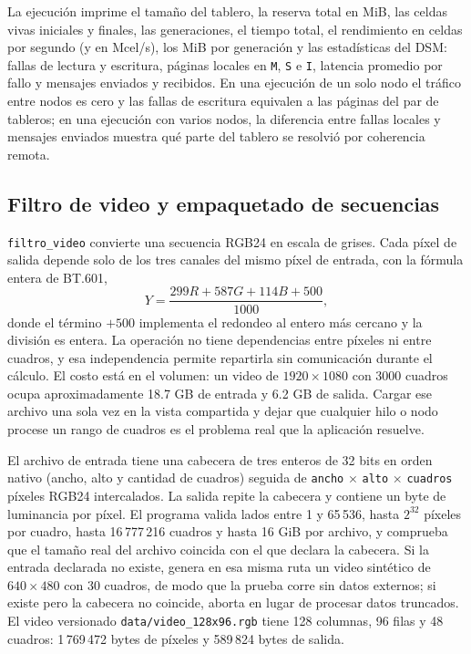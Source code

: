 La ejecución imprime el tamaño del tablero, la reserva total en MiB, las celdas vivas iniciales y finales, las generaciones, el tiempo total, el rendimiento en celdas por segundo (y en Mcel/s), los MiB por generación y las estadísticas del DSM: fallas de lectura y escritura, páginas locales en \texttt{M}, \texttt{S} e \texttt{I}, latencia promedio por fallo y mensajes enviados y recibidos. En una ejecución de un solo nodo el tráfico entre nodos es cero y las fallas de escritura equivalen a las páginas del par de tableros; en una ejecución con varios nodos, la diferencia entre fallas locales y mensajes enviados muestra qué parte del tablero se resolvió por coherencia remota.

\subsection{Filtro de video y empaquetado de secuencias}\label{sec:filtro}

\texttt{filtro\_video} convierte una secuencia RGB24 en escala de grises. Cada píxel de salida depende solo de los tres canales del mismo píxel de entrada, con la fórmula entera de BT.601,
\begin{equation}
Y = \frac{299R + 587G + 114B + 500}{1000},
\end{equation}
donde el término $+500$ implementa el redondeo al entero más cercano y la división es entera. La operación no tiene dependencias entre píxeles ni entre cuadros, y esa independencia permite repartirla sin comunicación durante el cálculo. El costo está en el volumen: un video de $1920 \times 1080$ con 3000 cuadros ocupa aproximadamente 18.7 GB de entrada y 6.2 GB de salida. Cargar ese archivo una sola vez en la vista compartida y dejar que cualquier hilo o nodo procese un rango de cuadros es el problema real que la aplicación resuelve.

El archivo de entrada tiene una cabecera de tres enteros de 32 bits en orden nativo (ancho, alto y cantidad de cuadros) seguida de \texttt{ancho} $\times$ \texttt{alto} $\times$ \texttt{cuadros} píxeles RGB24 intercalados. La salida repite la cabecera y contiene un byte de luminancia por píxel. El programa valida lados entre 1 y 65\,536, hasta $2^{32}$ píxeles por cuadro, hasta 16\,777\,216 cuadros y hasta 16 GiB por archivo, y comprueba que el tamaño real del archivo coincida con el que declara la cabecera. Si la entrada declarada no existe, genera en esa misma ruta un video sintético de $640 \times 480$ con 30 cuadros, de modo que la prueba corre sin datos externos; si existe pero la cabecera no coincide, aborta en lugar de procesar datos truncados. El video versionado \texttt{data/video\_128x96.rgb} tiene 128 columnas, 96 filas y 48 cuadros: 1\,769\,472 bytes de píxeles y 589\,824 bytes de salida.

